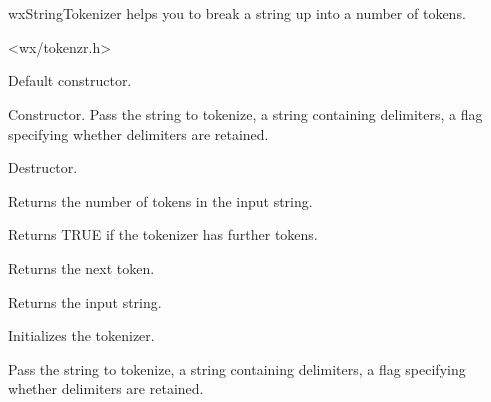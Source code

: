 \section{}\label{wxstringtokenizer}

wxStringTokenizer helps you to break a string up into a number of tokens.




<wx/tokenzr.h>


\label{wxstringtokenizerwxstringtokenizer}


Default constructor.


Constructor. Pass the string to tokenize, a string containing delimiters,
a flag specifying whether delimiters are retained.

\label{wxstringtokenizerdtor}


Destructor.

\label{wxstringtokenizercounttokens}


Returns the number of tokens in the input string.

\label{wxstringtokenizerhasmoretoken}


Returns TRUE if the tokenizer has further tokens.

\label{wxstringtokenizernexttoken}


Returns the next token.

\label{wxstringtokenizergetstring}


Returns the input string.

\label{wxstringtokenizersetstring}


Initializes the tokenizer.

Pass the string to tokenize, a string containing delimiters,
a flag specifying whether delimiters are retained.

